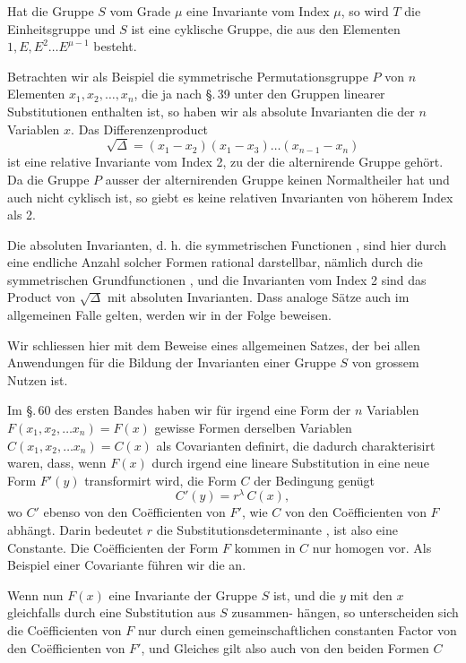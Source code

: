 Hat die Gruppe $S$ vom Grade $\mu$ eine Invariante vom Index
 $\mu$, so wird $T$ die Einheitsgruppe und $S$ ist eine cyklische
Gruppe, die aus den Elementen $1, E, E^2 \ldots E^{\mu-1}$ besteht.

Betrachten wir als Beispiel die symmetrische Permutationsgruppe
 $P$ von $n$ Elementen $x_1,x_2,\ldots,x_n$, die ja nach \S.\,39 unter
den Gruppen linearer Substitutionen enthalten ist, so haben wir
als absolute Invarianten die  der
$n$ Variablen $x$. Das Differenzenproduct
\[
\sqrt{\varDelta} = (x_1-x_2)(x_1-x_3)\ldots(x_{n-1}-x_n)
\]
ist eine relative Invariante vom Index 2, zu der die alternirende
Gruppe gehört. Da die Gruppe $P$ ausser der alternirenden
Gruppe keinen Normaltheiler hat und auch nicht cyklisch ist, so
giebt es keine relativen Invarianten von höherem Index als 2.

Die absoluten Invarianten, d. h. die symmetrischen Functionen
, sind hier durch eine endliche Anzahl solcher Formen
rational darstellbar, nämlich durch die symmetrischen Grundfunctionen
, und die Invarianten vom Index 2 sind das Product
von $\sqrt{\varDelta}$ mit absoluten Invarianten. Dass analoge S\"atze auch
im allgemeinen Falle gelten, werden wir in der Folge beweisen.

Wir schliessen hier mit dem Beweise eines allgemeinen
Satzes, der bei allen Anwendungen f\"ur die Bildung der Invarianten
einer Gruppe $S$ von grossem Nutzen ist.

Im \S.\,60 des ersten Bandes haben wir f\"ur irgend eine Form
der $n$ Variablen $F(x_1,x_2,\ldots x_n) = F(x)$ gewisse Formen derselben
 Variablen $C(x_1,x_2,\ldots x_n) = C(x)$ als Covarianten
definirt, die dadurch charakterisirt waren, dass, wenn $F(x)$ durch
irgend eine lineare Substitution in eine neue Form $F'(y)$ transformirt
 wird, die Form $C$ der Bedingung genügt
\[
C'(y) = r^\lambda\,C(x),
\]
wo $C'$ ebenso von den Co\"efficienten von $F'$, wie $C$ von den
Co\"efficienten von $F$ abhängt. Darin bedeutet $r$ die Substitutionsdeterminante
, ist also eine Constante. Die Co\"efficienten der
Form $F$ kommen in $C$ nur homogen vor. Als Beispiel einer Covariante
 f\"uhren wir die  an.

Wenn nun $F(x)$ eine Invariante der Gruppe $S$ ist, und die
$y$ mit den $x$ gleichfalls durch eine Substitution aus $S$ zusammen-
h\"angen, so unterscheiden sich die Co\"efficienten von $F$ nur durch
einen gemeinschaftlichen constanten Factor von den Co\"efficienten
von $F'$, und Gleiches gilt also auch von den beiden Formen $C$
